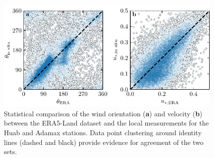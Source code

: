\begin{figure}[p]
\centering
\includegraphics[scale=1]{Figures/Figure5_supp.pdf}
\caption{Statistical comparison of the wind orientation (\textbf{a}) and velocity (\textbf{b}) between the ERA5-Land dataset and the local measurements for the Huab and Adamax stations. Data point clustering around identity lines (dashed and black) provide evidence for agreement of the two sets.}
\label{Fig5_supp}
\end{figure}


